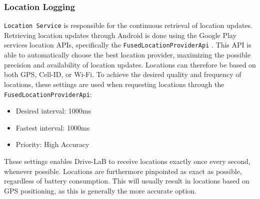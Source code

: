 \subsubsection{Location Logging}\label{subsubsec:location_logging}
\texttt{Location Service} is responsible for the continuous retrieval of location updates. Retrieving location updates through Android is done using the Google Play services location APIs, specifically the \texttt{FusedLocationProviderApi} \citep{android_fusedlocationproviderapi}. This API is able to automatically choose the best location provider, maximizing the possible precision and availability of location updates. Locations can therefore be based on both GPS, Cell-ID, or Wi-Fi. To achieve the desired quality and frequency of locations, these settings are used when requesting locations through the \texttt{FusedLocationProviderApi}:

\begin{itemize}
\item Desired interval: 1000ms
\item Fastest interval: 1000ms
\item Priority: High Accuracy
\end{itemize}

These settings enables Drive-LaB to receive locations exactly once every second, whenever possible. Locations are furthermore pinpointed as exact as possible, regardless of battery consumption. This will usually result in locations based on GPS positioning, as this is generally the more accurate option.